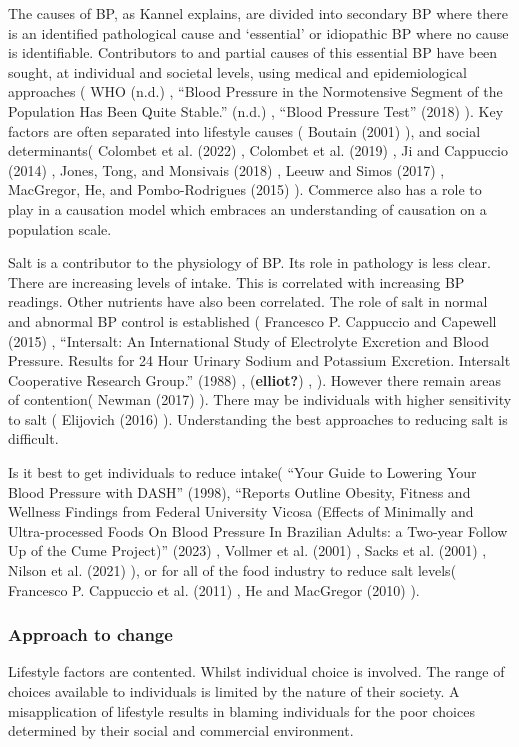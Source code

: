 \documentclass[
]{article}
\begin{document}
The causes of BP, as Kannel explains, are divided into secondary BP
where there is an identified pathological cause and `essential' or
idiopathic BP where no cause is identifiable. Contributors to and
partial causes of this essential BP have been sought, at individual and
societal levels, using medical and epidemiological approaches ( WHO
(n.d.) , {``Blood Pressure in the Normotensive Segment of the Population
Has Been Quite Stable.''} (n.d.) , {``Blood Pressure Test''} (2018) ).
Key factors are often separated into lifestyle causes ( Boutain (2001)
), and social determinants( Colombet et al. (2022) , Colombet et al.
(2019) , Ji and Cappuccio (2014) , Jones, Tong, and Monsivais (2018) ,
Leeuw and Simos (2017) , MacGregor, He, and Pombo-Rodrigues (2015) ).
Commerce also has a role to play in a causation model which embraces an
understanding of causation on a population scale.

Salt is a contributor to the physiology of BP. Its role in pathology is
less clear. There are increasing levels of intake. This is correlated
with increasing BP readings. Other nutrients have also been correlated.
The role of salt in normal and abnormal BP control is established (
Francesco P. Cappuccio and Capewell (2015) , {``Intersalt: An
International Study of Electrolyte Excretion and Blood Pressure. Results
for 24 Hour Urinary Sodium and Potassium Excretion. Intersalt
Cooperative Research Group.''} (1988) , (\textbf{elliot?}) , ). However
there remain areas of contention( Newman (2017) ). There may be
individuals with higher sensitivity to salt ( Elijovich (2016) ).
Understanding the best approaches to reducing salt is difficult.

Is it best to get individuals to reduce intake( {``Your Guide to
Lowering Your Blood Pressure with DASH''} (1998), {``Reports Outline
Obesity, Fitness and Wellness Findings from Federal University Vicosa
(Effects of Minimally and Ultra-processed Foods On Blood Pressure In
Brazilian Adults: a Two-year Follow Up of the Cume Project)''} (2023) ,
Vollmer et al. (2001) , Sacks et al. (2001) , Nilson et al. (2021) ), or
for all of the food industry to reduce salt levels( Francesco P.
Cappuccio et al. (2011) , He and MacGregor (2010) ).

\hypertarget{approach-to-change}{%
\subsubsection{Approach to change}\label{approach-to-change}}

Lifestyle factors are contented. Whilst individual choice is involved.
The range of choices available to individuals is limited by the nature
of their society. A misapplication of lifestyle results in blaming
individuals for the poor choices determined by their social and
commercial environment.
\end{document}
